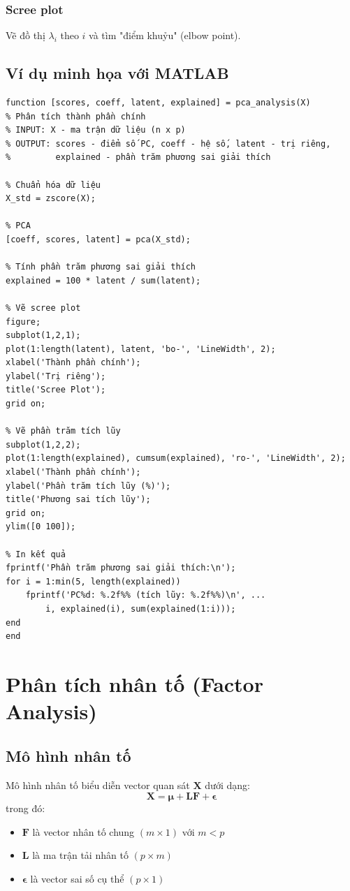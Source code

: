 \subsubsection*{Scree plot}
Vẽ đồ thị $\lambda_i$ theo $i$ và tìm "điểm khuỷu" (elbow point).

\subsection{Ví dụ minh họa với MATLAB}
\begin{matlab}
\begin{lstlisting}
function [scores, coeff, latent, explained] = pca_analysis(X)
% Phân tích thành phần chính
% INPUT: X - ma trận dữ liệu (n x p)
% OUTPUT: scores - điểm số PC, coeff - hệ số, latent - trị riêng, 
%         explained - phần trăm phương sai giải thích

% Chuẩn hóa dữ liệu
X_std = zscore(X);

% PCA
[coeff, scores, latent] = pca(X_std);

% Tính phần trăm phương sai giải thích
explained = 100 * latent / sum(latent);

% Vẽ scree plot
figure;
subplot(1,2,1);
plot(1:length(latent), latent, 'bo-', 'LineWidth', 2);
xlabel('Thành phần chính');
ylabel('Trị riêng');
title('Scree Plot');
grid on;

% Vẽ phần trăm tích lũy
subplot(1,2,2);
plot(1:length(explained), cumsum(explained), 'ro-', 'LineWidth', 2);
xlabel('Thành phần chính');
ylabel('Phần trăm tích lũy (%)');
title('Phương sai tích lũy');
grid on;
ylim([0 100]);

% In kết quả
fprintf('Phần trăm phương sai giải thích:\n');
for i = 1:min(5, length(explained))
    fprintf('PC%d: %.2f%% (tích lũy: %.2f%%)\n', ...
        i, explained(i), sum(explained(1:i)));
end
end
\end{lstlisting}
\end{matlab}

\section{Phân tích nhân tố (Factor Analysis)}

\subsection{Mô hình nhân tố}
\begin{dn}
Mô hình nhân tố biểu diễn vector quan sát $\mathbf{X}$ dưới dạng:
\[
\mathbf{X} = \boldsymbol{\mu} + \mathbf{L}\mathbf{F} + \boldsymbol{\epsilon}
\]
trong đó:
\begin{itemize}
    \item $\mathbf{F}$ là vector nhân tố chung $(m \times 1)$ với $m < p$
    \item $\mathbf{L}$ là ma trận tải nhân tố $(p \times m)$
    \item $\boldsymbol{\epsilon}$ là vector sai số cụ thể $(p \times 1)$
\end{itemize}
\end{dn}

